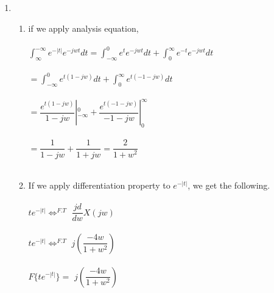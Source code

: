 \documentclass[10pt,a4paper, margin=1in]{article}
\begin{document}
\begin{enumerate}
\item %
    \begin{enumerate}
    \item %
    if we apply analysis equation,\\\\
    $\int^{-\infty}_{\infty}e^{-|t|}e^{-jwt}dt = \int^{0}_{-\infty}e^{t}e^{-jwt}dt + \int^{\infty}_{0}e^{-t}e^{-jwt}dt $\\\\
    $=\int^{0}_{-\infty}e^{t(1-jw)}dt + \int^{\infty}_{0}e^{t(-1-jw)}dt$\\\\
    $=\dfrac{e^{t(1-jw)}}{1-jw}|^{0}_{-\infty} + \dfrac{e^{t(-1-jw)}}{-1-jw}|^{\infty}_{0}$\\\\
    $=\dfrac{1}{1-jw} + \dfrac{1}{1+jw} = \dfrac{2}{1+w^{2}}$\\\\
    \item %
    If we apply differentiation property to $e^{-|t|}$, we get the following.\\\\
    $te^{-|t|} \Longleftrightarrow^{F.T}$ $\dfrac{jd}{dw}X(jw)$\\\\
    $te^{-|t|} \Longleftrightarrow^{F.T}$ $j(\dfrac{-4w}{1+w^{2}})$\\\\
    $F\{te^{-|t|}\}=$ $j(\dfrac{-4w}{1+w^{2}})$\\\\


\end{enumerate}
\end{enumerate}
\end{document}
